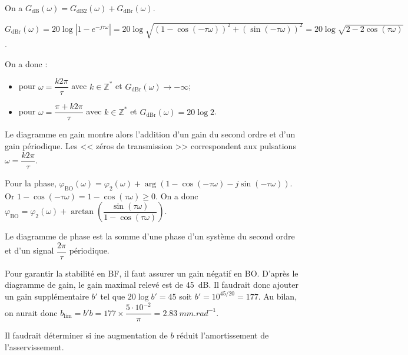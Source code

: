 \begin{corrige}
On a $G_{\text{dB}}(\omega)=G_{\text{dB2}}(\omega) + G_{\text{dBr}}(\omega)$.

$G_{\text{dBr}}(\omega) = 20\log \left|1-e^{-j\tau \omega} \right|=20\log 
\sqrt{\left( 1-\cos \left(-\tau \omega \right)\right)^2 + \left( \sin \left(-\tau \omega \right)\right)^2 } = 20\log \sqrt{2-2\cos \left( \tau \omega \right)}$.

On a donc :
\begin{itemize}
\item pour $\omega=\dfrac{k2\pi }{\tau}$ avec $k\in \mathbb{Z}^*$ et $G_{\text{dBr}}(\omega) \to -\infty $;
\item pour $\omega=\dfrac{\pi + k2\pi }{\tau}$ avec $k\in \mathbb{Z}^*$ et $G_{\text{dBr}}(\omega) = 20 \log 2$.
\end{itemize}

Le diagramme en gain montre alors l'addition d'un gain du second ordre et d'un gain périodique. Les << zéros de transmission >> correspondent aux pulsations $\omega=\dfrac{k2\pi }{\tau}$.

Pour la phase, $\varphi_{\text{BO}}\left( \omega\right)=\varphi_2\left( \omega\right)+\arg\left( 1-\cos\left( -\tau\omega\right) - j\sin\left(-\tau\omega\right)\right)$. Or $1-\cos\left( -\tau\omega\right) = 1-\cos\left( \tau \omega \right) \geq 0$. On a donc 
 $\varphi_{\text{BO}}=\varphi_2\left( \omega\right)+\arctan \left(\dfrac{\sin\left( \tau\omega\right)}{1-\cos\left( \tau\omega\right)} \right)$.

Le diagramme de  phase est la somme d'une phase d'un système du second ordre et d'un signal $\dfrac{2\pi}{\tau}$ périodique. 
\end{corrige}
\else
\fi

\ifprof
\begin{corrige}
Pour garantir la stabilité en BF, il faut assurer un gain négatif en BO. D'après le diagramme de gain, le gain maximal relevé est de \SI{45}{dB}. Il faudrait donc ajouter un gain supplémentaire $b'$ tel que $20\log b' = 45$ soit $b'=10^{45/20}=177$. Au bilan, on aurait donc $b_{\text{lim}}=b' b = 177\times \dfrac{5\cdot 10^{-2}}{\pi}=
\SI{2,83}{mm.rad^{-1}}$.

Il faudrait déterminer si ine augmentation de $b$ réduit l'amortissement de l'asservissement. 

\end{corrige}
\else
\fi
